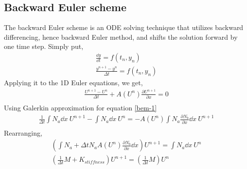 \documentclass[12pt, oneside]{article}
\begin{document}
\subsection{Backward Euler scheme}
The backward Euler scheme is an ODE solving technique that utilizes backward differencing, hence backward Euler method, and shifts the solution forward by one time step. Simply put,
\begin{equation}
    \begin{gathered}
	\frac{\dd y}{\dd t} = f \left( t_n, y_n \right) \\
	\frac{y^{n+1} - y^n}{\Delta t} = f \left( t_n, y_n \right) 
    \end{gathered}
    \label{bem}
\end{equation}
Applying it to the 1D Euler equations, we get,
\begin{equation}
    \begin{gathered}
	\frac {U^{n+1} - U^n} {\Delta t} + A(U^n) \frac {\partial U^{n+1}} { \partial x} = 0\\
	\label{bem-1}
    \end{gathered}
\end{equation}
Using Galerkin approximation for equation \ref{bem-1}
\begin{equation}
    \begin{gathered}
	\frac{1}{\Delta t} \int N_a \dd x\ U^{n+1} - \int N_a \dd x\ U^n = - A(U^n) \int N_a  \frac {\partial N_b} { \partial x} \dd x\ U^{n+1} \\
    \end{gathered}
\end{equation}
Rearranging, 
\begin{equation}
    \begin{gathered}
	\left( \int N_a + \Delta t N_a A(U^n) \frac {\partial N_b} { \partial x} \dd x \right) U^{n+1} =  \int N_a \dd x\ U^n \\ 
	\left( \frac{1}{\Delta t} M + K_{stiffness} \right) U^{n+1} = \left( \frac{1}{\Delta t} M \right) U^n  
    \end{gathered}
\end{equation}
\end{document}
